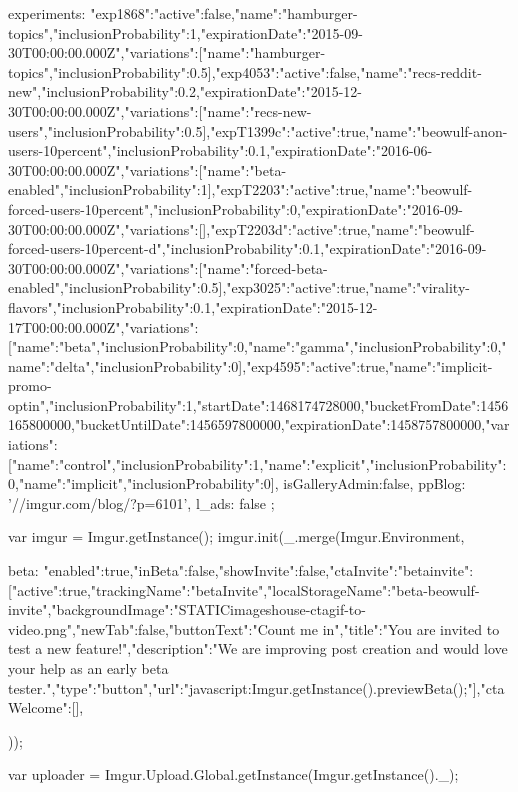 {{{                experiments:   {"exp1868":{"active":false,"name":"hamburger-topics","inclusionProbability":1,"expirationDate":"2015-09-30T00:00:00.000Z","variations":[{"name":"hamburger-topics","inclusionProbability":0.5}]},"exp4053":{"active":false,"name":"recs-reddit-new","inclusionProbability":0.2,"expirationDate":"2015-12-30T00:00:00.000Z","variations":[{"name":"recs-new-users","inclusionProbability":0.5}]},"expT1399c":{"active":true,"name":"beowulf-anon-users-10percent","inclusionProbability":0.1,"expirationDate":"2016-06-30T00:00:00.000Z","variations":[{"name":"beta-enabled","inclusionProbability":1}]},"expT2203":{"active":true,"name":"beowulf-forced-users-10percent","inclusionProbability":0,"expirationDate":"2016-09-30T00:00:00.000Z","variations":[]},"expT2203d":{"active":true,"name":"beowulf-forced-users-10percent-d","inclusionProbability":0.1,"expirationDate":"2016-09-30T00:00:00.000Z","variations":[{"name":"forced-beta-enabled","inclusionProbability":0.5}]},"exp3025":{"active":true,"name":"virality-flavors","inclusionProbability":0.1,"expirationDate":"2015-12-17T00:00:00.000Z","variations":[{"name":"beta","inclusionProbability":0},{"name":"gamma","inclusionProbability":0},{"name":"delta","inclusionProbability":0}]},"exp4595":{"active":true,"name":"implicit-promo-optin","inclusionProbability":1,"startDate":1468174728000,"bucketFromDate":1456165800000,"bucketUntilDate":1456597800000,"expirationDate":1458757800000,"variations":[{"name":"control","inclusionProbability":1},{"name":"explicit","inclusionProbability":0},{"name":"implicit","inclusionProbability":0}]}},
                isGalleryAdmin:false,
                ppBlog: '//imgur.com/blog/?p=6101',
                l_ads: false
            };

            var imgur = Imgur.getInstance();
            imgur.init(_.merge(Imgur.Environment, {
                
                
                beta: {"enabled":true,"inBeta":false,"showInvite":false,"ctaInvite":{"betainvite":[{"active":true,"trackingName":"betaInvite","localStorageName":"beta-beowulf-invite","backgroundImage":"{STATIC}\/images\/house-cta\/gif-to-video.png","newTab":false,"buttonText":"Count me in","title":"You are invited to test a new feature!","description":"We are improving post creation and would love your help as an early beta tester.","type":"button","url":"javascript:Imgur.getInstance().previewBeta();"}]},"ctaWelcome":[]},
            }));

                            var uploader = Imgur.Upload.Global.getInstance(Imgur.getInstance()._);

}}
